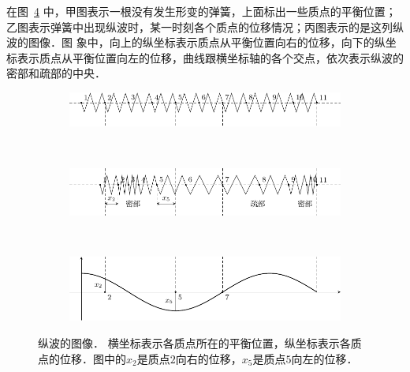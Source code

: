 在图~\ref{fig_A_9-19} 中，甲图表示一根没有发生形变的弹簧，上面标出一些质点的平衡位置；乙图表示弹簧中出现纵波时，某一时刻各个质点的位移情况；丙图表示的是这列纵波的图像．图
象中，向上的纵坐标表示质点从平衡位置向右的位移，向下的纵坐标表示质点从平衡位置向左的位移，曲线跟横坐标轴的各个交点，依次表示纵波的密部和疏部的中央．


\begin{figure}[htbp]
    \centering
    \begin{subfigure}{0.8\linewidth}
        \centering
        \includegraphics{fig/A/9-19a.pdf}
        \caption{}\label{fig_A_9-19a}
    \end{subfigure}
    \\
    \begin{subfigure}{0.8\linewidth}
        \centering
        \includegraphics{fig/A/9-19b.pdf}
        \caption{}\label{fig_A_9-19b}
    \end{subfigure}
    \\
    \begin{subfigure}{0.8\linewidth}
        \centering
        \includegraphics{fig/A/9-19c.pdf}
        \caption{}\label{fig_A_9-19c}
    \end{subfigure}
    \caption{纵波的图像．
    横坐标表示各质点所在的平衡位置，纵坐标表示各质点的位移．图中的$x_2$是质点$2$向右的位移，$x_5$是质点$5$向左的位移．}\label{fig_A_9-19}
\end{figure}



